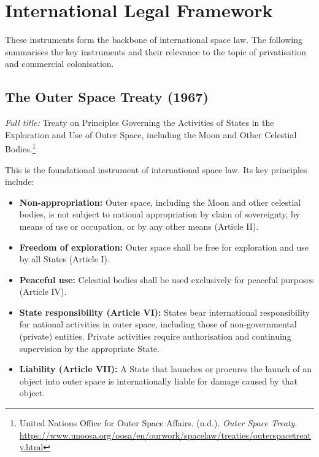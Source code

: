 \section{International Legal Framework}


These instruments form the backbone of international space law. The following summarises the key instruments and their relevance to the topic of privatisation and commercial colonisation.

\subsection{The Outer Space Treaty (1967)}

\emph{Full title:} Treaty on Principles Governing the Activities of States in the Exploration and Use of Outer Space, including the Moon and Other Celestial Bodies.\footnote{United Nations Office for Outer Space Affairs. (n.d.). \emph{Outer Space Treaty}. \url{https://www.unoosa.org/oosa/en/ourwork/spacelaw/treaties/outerspacetreaty.html}}

This is the foundational instrument of international space law. Its key principles include:

\begin{itemize}
  \item \textbf{Non-appropriation:} Outer space, including the Moon and other celestial bodies, is not subject to national appropriation by claim of sovereignty, by means of use or occupation, or by any other means (Article II).
  \item \textbf{Freedom of exploration:} Outer space shall be free for exploration and use by all States (Article I).
  \item \textbf{Peaceful use:} Celestial bodies shall be used exclusively for peaceful purposes (Article IV).
  \item \textbf{State responsibility (Article VI):} States bear international responsibility for national activities in outer space, including those of non-governmental (private) entities. Private activities require authorisation and continuing supervision by the appropriate State.
  \item \textbf{Liability (Article VII):} A State that launches or procures the launch of an object into outer space is internationally liable for damage caused by that object.
\end{itemize}

